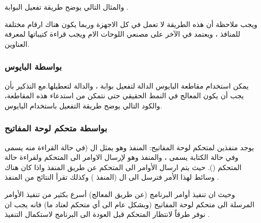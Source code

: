 \documentclass[document.tex]{subfiles}
\begin{document}
والمثال التالي يوضح طريقة تفعيل البوابة .


\begin{english}
\lstset{numberstyle=\tiny,numbersep=5pt,tabsize=2,extendedchars=true,breaklines=true,frame=b,showspaces=false, showtabs=false,xleftmargin=10pt,framexleftmargin=10pt,framexrightmargin=5pt,framexbottommargin=4pt,showstringspaces=false,language=[x86masm]Assembler}


\end{english}

ويجب ملاحظة أن هذه الطريقة لا تعمل في كل الاجهزة وربما يكون هناك ارقام مختلفة للمنافذ ، ويعتمد في الآخر على مصنعي اللوحات الام ويجب قراءة كتيباتها لمعرفة العناوين.

\subsubsection{بواسطة البايوس}
يمكن استخدام مقاطعة البايوس  الدالة  لتفعيل بوابة  ، والدالة  لتعطيلها.مع التذكير بأن يجب أن يكون المعالج في النمط الحقيقي حتى نتمكن من استدعاء هذه المقاطعة، والكود التالي يوضح طريقة التفعيل باستخدام البايوس.

\begin{english}
\lstset{numberstyle=\tiny,numbersep=5pt,tabsize=2,extendedchars=true,breaklines=true,frame=b,showspaces=false, showtabs=false,xleftmargin=10pt,framexleftmargin=10pt,framexrightmargin=5pt,framexbottommargin=4pt,showstringspaces=false,language=[x86masm]Assembler}


\end{english}

\subsubsection{بواسطة متحكم لوحة المفاتيح}
يوجد منفذين لمتحكم لوحة المفاتيح: المنفذ  وهو يمثل ال  (في حالة القراءة منه يسمى  وفي حالة الكتابة يسمى ، والمنفذ  وهو لإرسال الاوامر الى المتحكم ولقراءة حالة المتحكم (). حيث يتم ارسال الأوامر الى المتحكم عن طريق المنفذ  واذا كان هناك وسائط لهذا الأمر فترسل الى ال  (المنفذ ) وكذلك تقرأ النتائج من المنفذ .

وحيث ان تنفيذ أوامر البرنامج (عن طريق المعالج) أسرع بكثير من تنفيذ الأوامر المرسلة الى متحكم لوحة المفاتيح (وبشكل عام الى أي متحكم لعتاد ما)  فانه يجب ان نوفر طرقاً لانتظار المتحكم قبل العودة الى البرنامج لاستكمال التنفيذ .
\end{document}
